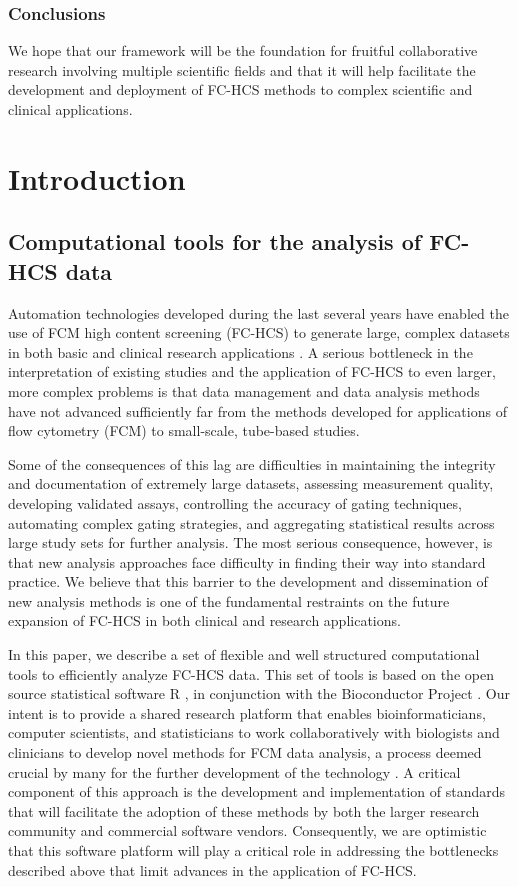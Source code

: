 \documentclass[12pt]{article}
\begin{document}
\subsubsection*{Conclusions}
We hope that our framework will be the foundation for fruitful 
collaborative research involving multiple scientific fields and
that it will help facilitate the
development and deployment of FC-HCS methods to complex 
scientific and clinical applications.

\section*{Introduction}
\subsection*{Computational tools for the analysis of FC-HCS data}
Automation technologies developed during the last several years have
enabled the use of FCM high content screening (FC-HCS) to generate
large, complex datasets in both basic and clinical research
applications \citep{brinkman2007hcf}. A serious bottleneck in the
interpretation of existing studies and the application of FC-HCS to
even larger, more complex problems is that data management and data
analysis methods have not advanced sufficiently far from the methods
developed for applications of flow cytometry (FCM) to small-scale,
tube-based studies.

Some of the consequences of this lag are difficulties in maintaining
the integrity and documentation of extremely large datasets, assessing
measurement quality, developing validated assays, controlling the
accuracy of gating techniques, automating complex gating strategies,
and aggregating statistical results across large study sets for
further analysis. The most serious consequence, however, is that new
analysis approaches face difficulty in finding their way into standard
practice. We believe that this barrier to the development and
dissemination of new analysis methods is one of the fundamental
restraints on the future expansion of FC-HCS in both clinical and
research applications.

In this paper, we describe a set of flexible and well structured
computational tools to efficiently analyze FC-HCS data. This set of
tools is based on the open source statistical software R
\citep{Rmain}, in conjunction with the Bioconductor Project
\citep{BIOC}. Our intent is to provide a shared research platform that
enables bioinformaticians, computer scientists, and statisticians to
work collaboratively with biologists and clinicians to develop novel
methods for FCM data analysis, a process deemed crucial by many for
the further development of the technology \citep{lizard2007fca}. A
critical component of this approach is the development and
implementation of standards that will facilitate the adoption of these
methods by both the larger research community and commercial software
vendors.  Consequently, we are optimistic that this software platform
will play a critical role in addressing the bottlenecks described
above that limit advances in the application of FC-HCS.
\end{document}

